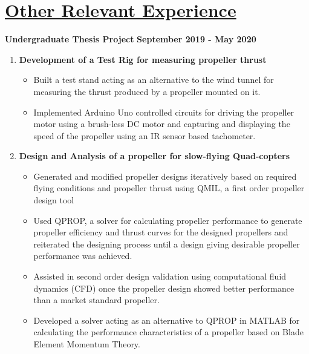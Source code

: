 \documentclass{article}
\def\majordaterig{\large{\textbf{September 2019 - December 2019}}}
\def\majordateprop{\large{\textbf{February 2020 - May 2020}}}
\def\majordate{\large{\textbf{September 2019 - May 2020}}}
\begin{document}
\section{\underline{Other Relevant Experience}}
\large{\textbf{Undergraduate Thesis Project}}
\hspace{3in}
\majordate
\begin{enumerate}
\item\large{\textbf{Development of a Test Rig for measuring propeller thrust}}
\begin{itemize}
\item \large{Built a test stand acting as an alternative to the wind tunnel for measuring the thrust produced by a propeller mounted on it.}
\item\large{Implemented Arduino Uno controlled circuits for driving the propeller motor using a brush-less DC motor and capturing and displaying the speed of the propeller using an IR sensor based tachometer.}
\end{itemize}
\vspace{2 in}


\item\large{\textbf{Design and Analysis of a propeller for slow-flying Quad-copters}}
\begin{itemize}
\item\large{Generated and modified propeller designs iteratively based on required flying conditions and propeller thrust using QMIL, a first order propeller design tool}
\item\large{Used QPROP, a solver for calculating propeller performance to generate propeller efficiency and thrust curves for the designed propellers and reiterated the designing process until a design giving desirable propeller performance was achieved.}
\item\large{Assisted in second order design validation using computational fluid dynamics (CFD) once the propeller design showed better performance than a market standard propeller.}
\item\large{Developed a solver acting as an alternative to QPROP in MATLAB for calculating the performance characteristics of a propeller based on Blade Element Momentum Theory.}
\end{itemize}
\end{enumerate}
\end{document}
